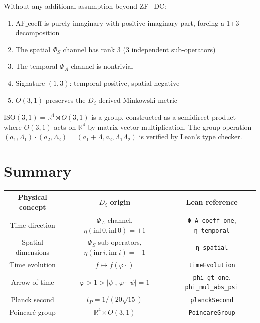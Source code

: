 \begin{theorem}
\label{thm:mat_spacetime_uniqueness}
\leanok
Without any additional assumption beyond ZF+DC:
\begin{enumerate}
\item $\mathrm{AF\_coeff}$ is purely imaginary with positive imaginary part, forcing a 1+3 decomposition
\item The spatial $\Phi_S$ channel has rank 3 (3 independent sub-operators)
\item The temporal $\Phi_A$ channel is nontrivial
\item Signature $(1,3)$: temporal positive, spatial negative
\item $O(3,1)$ preserves the $D_\zeta$-derived Minkowski metric
\end{enumerate}
\end{theorem}

\begin{theorem}
\label{thm:mat_poincare_group_constructed}
\leanok
$\mathrm{ISO}(3,1) = \mathbb{R}^4 \rtimes O(3,1)$ is a group, constructed as a semidirect product where $O(3,1)$ acts on $\mathbb{R}^4$ by matrix-vector multiplication. The group operation $(a_1, \Lambda_1) \cdot (a_2, \Lambda_2) = (a_1 + \Lambda_1 a_2, \Lambda_1 \Lambda_2)$ is verified by Lean's type checker.
\end{theorem}

\section{Summary}
\label{sec:mat_time_space_summary}

\begin{center}
\begin{tabular}{|c|c|c|}
\hline
Physical concept & $D_\zeta$ origin & Lean reference \\
\hline
Time direction & $\Phi_A$-channel, $\eta(\mathrm{inl}\,0,\mathrm{inl}\,0) = +1$ & \texttt{Φ\_A\_coeff\_one}, \texttt{η\_temporal} \\
Spatial dimensions & $\Phi_S$ sub-operators, $\eta(\mathrm{inr}\,i,\mathrm{inr}\,i) = -1$ & \texttt{η\_spatial} \\
Time evolution & $f \mapsto f(\varphi \cdot)$ & \texttt{timeEvolution} \\
Arrow of time & $\varphi > 1 > |\psi|$, $\varphi \cdot |\psi| = 1$ & \texttt{phi\_gt\_one}, \texttt{phi\_mul\_abs\_psi} \\
Planck second & $t_P = 1/(20\sqrt{15})$ & \texttt{planckSecond} \\
Poincar\'{e} group & $\mathbb{R}^4 \rtimes O(3,1)$ & \texttt{PoincareGroup} \\
\hline
\end{tabular}
\end{center}
